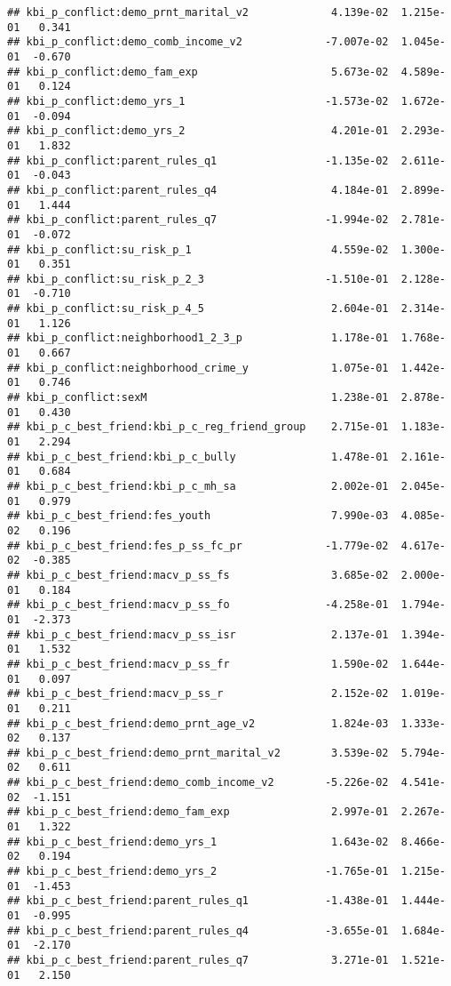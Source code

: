\documentclass[
]{article}
\begin{document}
\begin{verbatim}
## kbi_p_conflict:demo_prnt_marital_v2             4.139e-02  1.215e-01   0.341
## kbi_p_conflict:demo_comb_income_v2             -7.007e-02  1.045e-01  -0.670
## kbi_p_conflict:demo_fam_exp                     5.673e-02  4.589e-01   0.124
## kbi_p_conflict:demo_yrs_1                      -1.573e-02  1.672e-01  -0.094
## kbi_p_conflict:demo_yrs_2                       4.201e-01  2.293e-01   1.832
## kbi_p_conflict:parent_rules_q1                 -1.135e-02  2.611e-01  -0.043
## kbi_p_conflict:parent_rules_q4                  4.184e-01  2.899e-01   1.444
## kbi_p_conflict:parent_rules_q7                 -1.994e-02  2.781e-01  -0.072
## kbi_p_conflict:su_risk_p_1                      4.559e-02  1.300e-01   0.351
## kbi_p_conflict:su_risk_p_2_3                   -1.510e-01  2.128e-01  -0.710
## kbi_p_conflict:su_risk_p_4_5                    2.604e-01  2.314e-01   1.126
## kbi_p_conflict:neighborhood1_2_3_p              1.178e-01  1.768e-01   0.667
## kbi_p_conflict:neighborhood_crime_y             1.075e-01  1.442e-01   0.746
## kbi_p_conflict:sexM                             1.238e-01  2.878e-01   0.430
## kbi_p_c_best_friend:kbi_p_c_reg_friend_group    2.715e-01  1.183e-01   2.294
## kbi_p_c_best_friend:kbi_p_c_bully               1.478e-01  2.161e-01   0.684
## kbi_p_c_best_friend:kbi_p_c_mh_sa               2.002e-01  2.045e-01   0.979
## kbi_p_c_best_friend:fes_youth                   7.990e-03  4.085e-02   0.196
## kbi_p_c_best_friend:fes_p_ss_fc_pr             -1.779e-02  4.617e-02  -0.385
## kbi_p_c_best_friend:macv_p_ss_fs                3.685e-02  2.000e-01   0.184
## kbi_p_c_best_friend:macv_p_ss_fo               -4.258e-01  1.794e-01  -2.373
## kbi_p_c_best_friend:macv_p_ss_isr               2.137e-01  1.394e-01   1.532
## kbi_p_c_best_friend:macv_p_ss_fr                1.590e-02  1.644e-01   0.097
## kbi_p_c_best_friend:macv_p_ss_r                 2.152e-02  1.019e-01   0.211
## kbi_p_c_best_friend:demo_prnt_age_v2            1.824e-03  1.333e-02   0.137
## kbi_p_c_best_friend:demo_prnt_marital_v2        3.539e-02  5.794e-02   0.611
## kbi_p_c_best_friend:demo_comb_income_v2        -5.226e-02  4.541e-02  -1.151
## kbi_p_c_best_friend:demo_fam_exp                2.997e-01  2.267e-01   1.322
## kbi_p_c_best_friend:demo_yrs_1                  1.643e-02  8.466e-02   0.194
## kbi_p_c_best_friend:demo_yrs_2                 -1.765e-01  1.215e-01  -1.453
## kbi_p_c_best_friend:parent_rules_q1            -1.438e-01  1.444e-01  -0.995
## kbi_p_c_best_friend:parent_rules_q4            -3.655e-01  1.684e-01  -2.170
## kbi_p_c_best_friend:parent_rules_q7             3.271e-01  1.521e-01   2.150

\end{verbatim}
\end{document}
